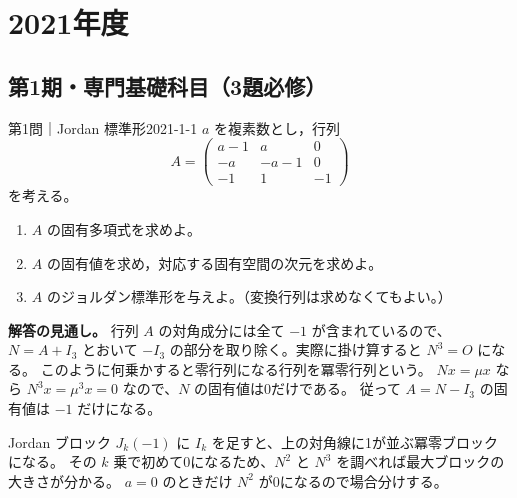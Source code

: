 \chapter{2021年度}
\label{ch:2021}

\section{第1期・専門基礎科目（3題必修）}

\begin{problem}{第1問｜Jordan 標準形}{2021-1-1}
$a$ を複素数とし，行列
\[
A=\begin{pmatrix}a-1&a&0\\-a&-a-1&0\\-1&1&-1\end{pmatrix}
\]
を考える。
\begin{enumerate}
  \item[(1)] $A$ の固有多項式を求めよ。
  \item[(2)] $A$ の固有値を求め，対応する固有空間の次元を求めよ。
  \item[(3)] $A$ のジョルダン標準形を与えよ。（変換行列は求めなくてもよい。）
\end{enumerate}
\end{problem}
\begin{memo*}
\textbf{解答の見通し。}
行列 $A$ の対角成分には全て $-1$ が含まれているので、$N=A+I_3$ とおいて
$-I_3$ の部分を取り除く。実際に掛け算すると $N^3=O$ になる。
このように何乗かすると零行列になる行列を冪零行列という。
$Nx=\mu x$ なら $N^3x=\mu^3x=0$ なので、$N$ の固有値は0だけである。
従って $A=N-I_3$ の固有値は $-1$ だけになる。

Jordan ブロック $J_k(-1)$ に $I_k$ を足すと、上の対角線に1が並ぶ冪零ブロックになる。
その $k$ 乗で初めて0になるため、$N^2$ と $N^3$ を調べれば最大ブロックの大きさが分かる。
$a=0$ のときだけ $N^2$ が0になるので場合分けする。
\end{memo*}
